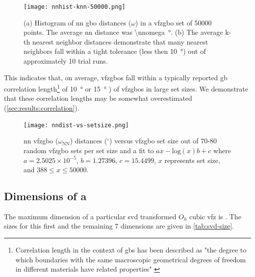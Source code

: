 \documentclass[final,twocolumn,12pt]{elsarticle}
\begin{document}
	\begin{figure}
		\centering
		\texttt{[image: nnhist-knn-50000.png]}
		\caption{(a) Histogram of \gls{nn} \gls{gbo} distances ($\omega$) in a \gls{vfzgbo} set of \num{50000} points. The average \gls{nn} distance was \SI{\nnomega}{\degree}. (b) The average k-th nearest neighbor distances demonstrate that many nearest neighbors fall within a tight tolerance (less then \SI{10}{\degree}) out of approximately 10 trial runs.}
		\label{fig:nnhist-knn-50000}
	\end{figure}
	
	This indicates that, on average, \outpt{} \glspl{vfzgbo} fall within a typically reported \gls{gb} correlation length\footnote{Correlation length in the context of \glspl{gb} has been described as "the degree to which boundaries with the same macroscopic geometrical degrees of freedom in different materials have related properties" \cite{olmstedSurveyComputedGrain2009}} of \SI{10}{\degree} \cite{rohrerComparingCalculatedMeasured2010} or \SI{15}{\degree} \cite{olmstedSurveyComputedGrain2009}) of \inpt{} \glspl{vfzgbo} in large set sizes. We demonstrate that these correlation lengths may be somewhat overestimated (\cref{sec:results:correlation}).
	
	\begin{figure}
		\centering
		\texttt{[image: nndist-vs-setsize.png]}
		\caption{\Gls{nn} \gls{vfzgbo} ($\omega_{\text{NN}}$) distances ($^{\circ}$) versus \gls{vfzgbo} set size out of 70-80 random \gls{vfzgbo} sets per set size and a fit to $ax-\mathrm{log}(x)b+c$ where $a=2.5025\times10^{-5}$, $b=1.27396$, $c=15.4499$, $x$ represents set size, and $388 \leq x \leq 50000$.}
		\label{fig:nndist-vs-setsize}
	\end{figure}
	
	\subsection{Dimensions of a } \label{sec:results:dimensions}
	
	The maximum dimension of a particular \gls{svd} transformed $O_h$ cubic \gls{vfz} is \dimOne{}. The sizes for this first and the remaining 7 dimensions are given in \cref{tab:svd-size}.
	
	\begin{table}[!htb]
	    \centering
    	    \caption{Dimension of \gls{svd} transformed coordinates (Dimension) and \gls{gbo} dimension size ($\omega$) for a set of \num{50000} \glspl{vfzgbo}. These are the diagonal entries of the "S" matrix in the \gls{svd} decomposition. }
    	    \label{tab:svd-size}
	\end{table}
	
\end{document}
